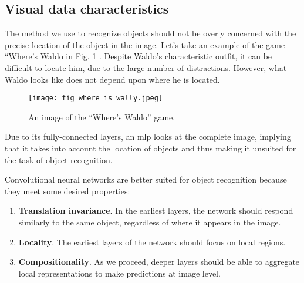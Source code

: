 \subsection{Visual data characteristics}
The method we use to recognize objects should not be overly concerned with the precise location of the object in the image. Let's take an example of the game “Where’s Waldo in Fig. \ref{fig:where_is_wally} \cite{zhang2021dive}. Despite Waldo's characteristic outfit, it can be difficult to locate him, due to the large number of distractions. However, what Waldo looks like does not depend upon where he is located. 
\begin{figure}[ht]
    \begin{center}       
    \texttt{[image: fig\_where\_is\_wally.jpeg]}
    \caption{An image of the “Where’s Waldo” game.}
    \label{fig:where_is_wally}
    \end{center}
\end{figure}

Due to its fully-connected layers, an \acrshort{mlp} looks at the complete image, implying that it takes into account the location of objects and thus making it unsuited for the task of object recognition.

Convolutional neural networks are better suited for object recognition because they meet some desired properties:
\begin{enumerate}
    \item \textbf{Translation invariance}. In the earliest layers, the network should respond similarly to the same object, regardless of where it appears in the image. 
    \item \textbf{Locality}. The earliest layers of the network should focus on local regions.
    \item \textbf{Compositionality}. As we proceed, deeper layers should be able to aggregate local representations to make predictions at image level.
\end{enumerate}

